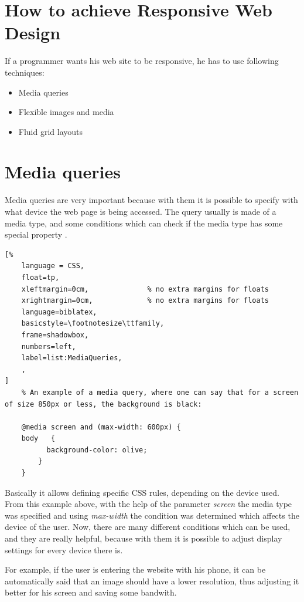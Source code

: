 \section{How to achieve Responsive Web Design}

If a programmer wants his web site to be responsive, he has to use
following techniques:
\begin{itemize}
    \item Media queries
    \item Flexible images and media
    \item Fluid grid layouts
\end{itemize}


\section{Media queries}

Media queries are very important because with them it is possible to specify
with what device the web page is being accessed. The query usually is made of
a media type, and some conditions which can check if the media type has some special
property \parencite{A.A.Mohamed}.



\begin{lstlisting}[%
    language = CSS, 
    float=tp,
    xleftmargin=0cm,              % no extra margins for floats
    xrightmargin=0cm,             % no extra margins for floats
    language=biblatex,
    basicstyle=\footnotesize\ttfamily,
    frame=shadowbox,
    numbers=left,
    label=list:MediaQueries,
    ,
]
    % An example of a media query, where one can say that for a screen of size 850px or less, the background is black:

    @media screen and (max-width: 600px) {
    body   {
          background-color: olive;
        }
    }
\end{lstlisting}



Basically it allows defining specific CSS rules, depending on the device used.
From this example above, with the help of the parameter \emph{screen}
the media type was specified and using \emph{max-width} the condition was determined which
affects the device of the user. Now, there are many different conditions which
can be used, and they are really helpful, because with them it is possible to adjust
display settings for every device there is.

For example, if the user is entering the website with his phone, it can be automatically said that an image should have a lower resolution,
thus adjusting it better for his screen and saving some bandwith.

